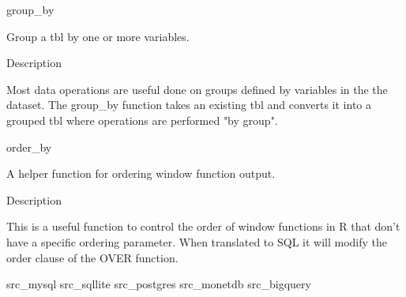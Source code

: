
group_by 

Group a tbl by one or more variables.

Description

Most data operations are useful done on groups defined by variables in the the dataset. The
group_by function takes an existing tbl and converts it into a grouped tbl where operations are
performed "by group".


order_by 

A helper function for ordering window function output.

Description

This is a useful function to control the order of window functions in R that don’t have a specific
ordering parameter. When translated to SQL it will modify the order clause of the OVER function.


src_mysql
src_sqllite
src_postgres
src_monetdb
src_bigquery
